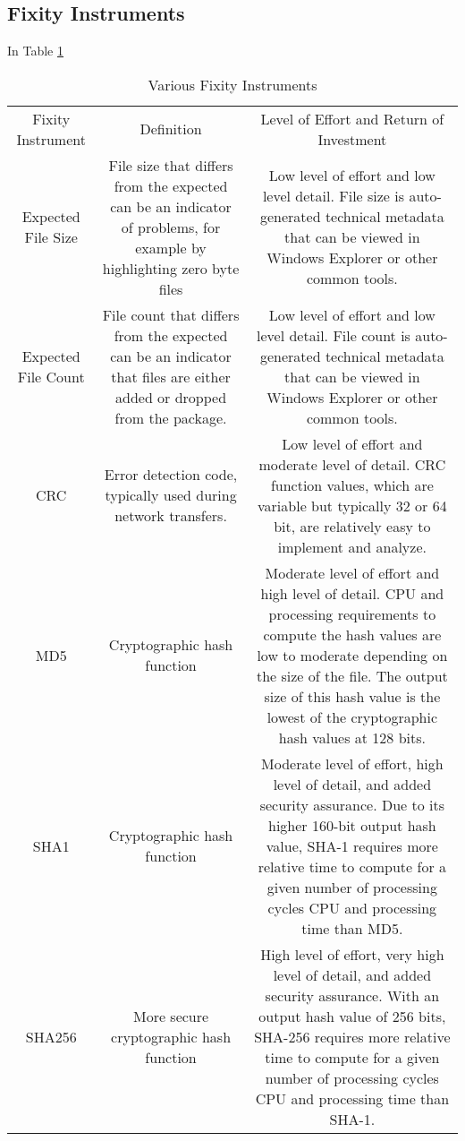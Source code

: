 \subsection{Fixity Instruments}
In Table \ref{tb:fixity-instruments} 
\begin{table}[t]
    \centering
    \caption{Various Fixity Instruments \cite[6]{ndsa2017fixity}}
    \label{tb:fixity-instruments}
    \begin{tabular}{ c c c }
     Fixity Instrument & Definition & Level of Effort and Return of Investment \\ 
     Expected File Size & File size that differs from the expected can be an indicator of problems, for example by highlighting zero byte files & Low level of effort and low level detail. File size is auto-generated technical metadata that can be viewed in Windows Explorer or other common tools. \\  
     Expected File Count & File count that differs from the expected can be an indicator that files are either added or dropped from the package. & Low level of effort and low level detail. File count is auto-generated technical metadata that can be viewed in Windows Explorer or other common tools.  \\
     CRC & Error detection code, typically used during network transfers. & Low level of effort and moderate level of detail. CRC function values, which are variable but typically 32 or 64 bit, are relatively easy to implement and analyze.  \\
     MD5 & Cryptographic hash function & Moderate level of effort and high level of detail. CPU and processing requirements to compute the hash values are low to moderate depending on the size of the file. The output size of this hash value is the lowest of the cryptographic hash values at 128 bits.  \\
     SHA1 & Cryptographic hash function & Moderate level of effort, high level of detail, and added security assurance. Due to its higher 160-bit output hash value, SHA-1 requires more relative time to compute for a given number of processing cycles CPU and processing time than MD5.  \\
     SHA256 & More secure cryptographic hash function & High level of effort, very high level of detail, and added security assurance. With an output hash value of 256 bits, SHA-256 requires more relative time to compute for a given number of processing cycles CPU and processing time than SHA-1.  
    \end{tabular}
\end{table}
